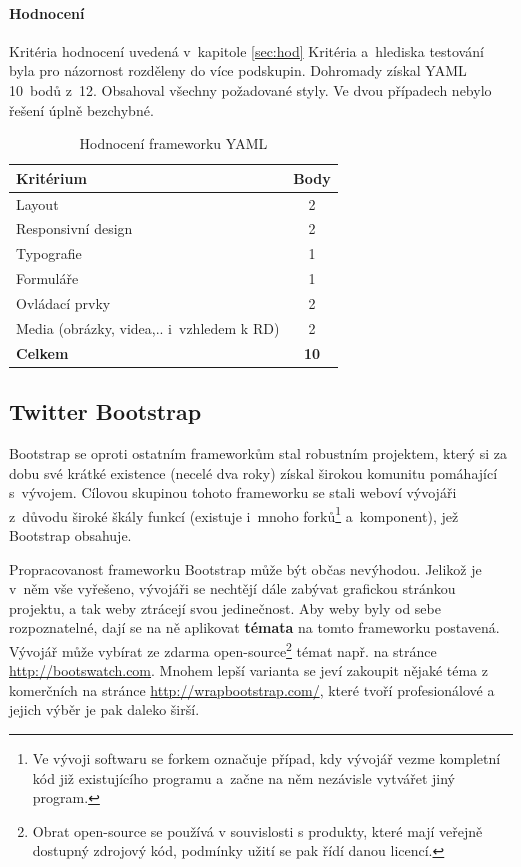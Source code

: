 \documentclass[thesis=B,czech]{FITthesis}[2012/06/26]
\begin{document}
\paragraph{Hodnocení}

Kritéria hodnocení uvedená v~kapitole \ref{sec:hod} Kritéria a~hlediska testování byla pro názornost rozděleny do více podskupin. Dohromady získal YAML 10~bodů z~12. Obsahoval všechny požadované styly. Ve dvou případech nebylo řešení úplně bezchybné.

\begin{table}[h]\centering
 	\caption[Hodnocení YAMLu]{Hodnocení frameworku YAML}\label{tab:yaml}
 	\begin{tabular}{|l|c|}\hline
 		\textbf{Kritérium} & \textbf{Body}\tabularnewline
  		\hline \hline
		Layout & 2\tabularnewline
		\hline 
		 Responsivní design & 2\tabularnewline
		\hline 
		Typografie & 1\tabularnewline
		\hline 
		Formuláře & 1\tabularnewline
		\hline 
		Ovládací prvky & 2\tabularnewline
		\hline 
		Media  (obrázky, videa,.. i~vzhledem k RD) & 2\tabularnewline
		\hline 
		\textbf{Celkem} & \textbf{10}\tabularnewline
		\hline 
 	\end{tabular}
\end{table} 

\subsection{Twitter Bootstrap}
\label{sec:boots}

Bootstrap se oproti ostatním frameworkům stal robustním projektem, který si za dobu své krátké existence (necelé dva roky) získal širokou komunitu pomáhající s~vývojem. Cílovou skupinou tohoto frameworku se stali weboví vývojáři z~důvodu široké škály funkcí (existuje i~mnoho forků\footnote{Ve vývoji softwaru se forkem označuje případ, kdy vývojář vezme kompletní kód již existujícího programu a~začne na něm nezávisle vytvářet jiný program.} a~komponent), jež Bootstrap obsahuje. 

Propracovanost frameworku Bootstrap může být občas nevýhodou. Jelikož je v~něm vše vyřešeno, vývojáři se nechtějí dále zabývat grafickou stránkou projektu, a tak weby ztrácejí svou jedinečnost.  Aby weby byly od sebe rozpoznatelné, dají se na ně aplikovat \textbf{témata} na tomto frameworku postavená.  Vývojář může vybírat ze zdarma open-source\footnote{Obrat open-source se používá v souvislosti s produkty, které mají veřejně dostupný zdrojový kód, podmínky užití se pak řídí danou licencí.} témat např. na stránce \url{http://bootswatch.com}. Mnohem lepší varianta se jeví zakoupit nějaké téma z komerčních na stránce \url{http://wrapbootstrap.com/}, které tvoří profesionálové a jejich výběr je pak daleko širší.
\end{document}
